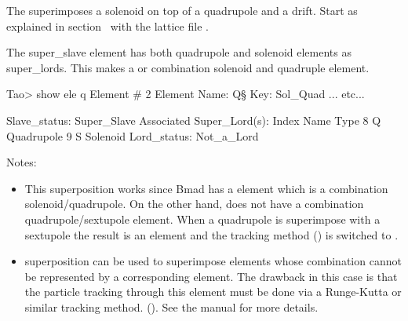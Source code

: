 \documentclass{hitec}     %
\begin{document}
The superimposes a solenoid on top of a quadrupole and a drift.  
Start \tao as explained in section~ with the lattice file
.

The  super_slave element has both quadrupole  and solenoid  elements as super_lords.
This makes  a  or combination solenoid and quadruple element.

\newpage

\begin{code}
Tao> show ele q\s
 Element #                2
 Element Name: Q\S
 Key: Sol_Quad
... etc...

Slave_status: Super_Slave
Associated Super_Lord(s):
   Index   Name                             Type
       8   Q                                Quadrupole
       9   S                                Solenoid
Lord_status:  Not_a_Lord
\end{code}

Notes:
\vspace{-5 pt}
\begin{itemize}
\item 
This superposition works since Bmad has a  element which is a combination
solenoid/quadrupole. On the other hand, \bmad does not have a combination quadrupole/sextupole element.
When a quadrupole is superimpose with a sextupole the result is an  element and the
tracking method () is switched to .
\item
{} superposition can be used to superimpose elements whose combination cannot be
represented by a corresponding \bmad element. The drawback in this case is that the particle
tracking through this element must be done via a Runge-Kutta or similar tracking
method. (). See the \bmad manual for more details.
\end{itemize}
\end{document}
